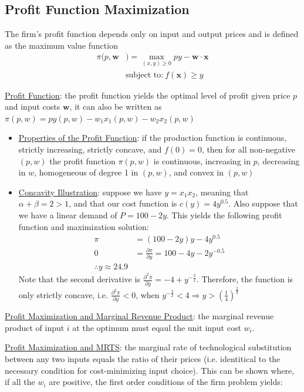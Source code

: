 \documentclass{article}
\begin{document}
\subsection{Profit Function Maximization}
The firm's profit function depends only on input and output prices and is defined as the maximum value function
\begin{align*}
  \pi (p,\mathbf{w}&) = \max_{(x,y) \geq 0} py - \mathbf{w} \cdot \mathbf{x} \\
  &\text{subject to:} \ f(\mathbf{x}) \geq y
\end{align*}
\par \vspace{0.3em}
  \underline{Profit Function}: the profit function yields the optimal level of profit given price $p$ and input costs $\mathbf{w}$, it can also be written as $\pi(p,w) = py(p,w) - w_{1}x_{1}(p,w) - w_{2}x_{2}(p,w)$
  \begin{itemize}
    \item  \underline{Properties of the Profit Function}: if the production function is continuous, strictly increasing, strictly concave, and $f(0) = 0$, then for all non-negative $(p,w)$ the profit function $\pi(p,w)$ is continuous, increasing in $p$, decreasing in $w$, homogeneous of degree 1 in $(p,w)$, and convex in $(p,w)$
    \item  \underline{Concavity Illustration}: suppose we have $y = x_{1}x_{2}$, meaning that $\alpha + \beta = 2 > 1$, and that our cost function is $c(y) = 4y^{0.5}$. Also suppose that we have a linear demand of $P = 100 - 2y$. This yields the following profit function and maximization solution:
    \begin{align*}
      \pi &= (100 - 2y)y - 4y^{0.5} \\
      0 &= \frac{\partial \pi}{\partial y} = 100 - 4y - 2y^{-0.5} \\
      \therefore y \approx 24.9
    \end{align*}
    Note that the second derivative is $\tfrac{\partial^{2} \pi}{\partial y} = -4 + y^{-\tfrac{3}{2}}$. Therefore, the function is only strictly concave, i.e. $\tfrac{\partial^{2} \pi}{\partial y} < 0$, when $y^{-\tfrac{3}{2}} < 4 \Rightarrow y > (\tfrac{1}{4})^{\tfrac{2}{3}}$
  \end{itemize}
  \par
  \underline{Profit Maximization and Marginal Revenue Product}: the marginal revenue product of input $i$ at the optimum must eqaul the unit input cost $w_{i}$.
  \par
  \underline{Profit Maximization and MRTS}: the marginal rate of technological substitution between any two inputs equals the ratio of their prices (i.e. identitical to the necessary condition for cost-minimizing input choice). This can be shown where, if all the $w_{i}$ are positive, the first order conditions of the firm problem yields:
\end{document}
